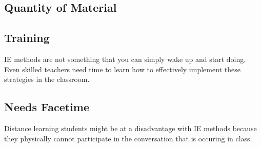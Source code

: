 \subsection{Quantity of Material}

\subsection{Training}

IE methods are not something that you can simply wake up and start doing. Even skilled teachers need time to learn how to effectively implement these strategies in the classroom.

\subsection{Needs Facetime}

Distance learning students might be at a disadvantage with IE methods because they physically cannot participate in the conversation that is occuring in class.